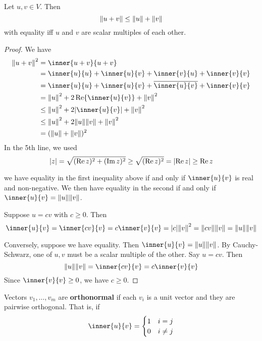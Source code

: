 \documentclass{article}
\begin{document}
\begin{cthm}
  Let $u, v \in V$. Then \[
    \norm{u+v} \leq \norm{u} + \norm{v}
  \] with equality iff $u$ and $v$ are scalar multiples of each other.
\end{cthm}
\begin{proof}
  We have
  \begin{align*}
    \norm{u + v}^2 & = \inner{u+v}{u+v}                                                     \\
                   & = \inner{u}{u} + \inner{u}{v} + \inner{v}{u} + \inner{v}{v}            \\
                   & = \inner{u}{u} + \inner{u}{v} + \overline{\inner{u}{v}} + \inner{v}{v} \\
                   & = \norm{u}^2 + 2\Re\inner{u}{v} + \norm{v}^2                           \\
                   & \leq \norm{u}^2 + 2\abs{\inner{u}{v}} + \norm{v}^2                     \\
                   & \leq \norm{u}^2 + 2\norm{u}\norm{v} + \norm{v}^2                       \\
                   & = (\norm{u}+ \norm{v})^2
  \end{align*}
  In the 5th line, we used \[
    \abs{z} = \sqrt{(\Re z)^2 + (\Im z)^2} \geq \sqrt{(\Re z)^2} = \abs{\Re z} \geq \Re z
  \]

  we have equality in the first inequality above if and only if $\inner{u}{v}$ is real and non-negative. We then have equality in the second if and only if $\inner{u}{v} = \norm{u}\norm{v}$.

  Suppose $u = cv$ with $c \geq 0$. Then \[
    \inner{u}{v} = \inner{cv}{v} = c\inner{v}{v} = \abs{c}\norm{v}^2 = \norm{cv}\norm{v} = \norm{u}\norm{v}
  \]

  Conversely, suppose we have equality. Then $\inner{u}{v} = \norm{u}\norm{v}$. By Cauchy-Schwarz, one of $u, v$ must be a scalar multiple of the other. Say $u = cv$. Then \[
    \norm{u}\norm{v} = \inner{cv}{v} = c\inner{v}{v}
  \]
  Since $\inner{v}{v} \geq 0$, we have $c \geq 0$.
\end{proof}
\begin{definition}
  Vectors $v_1, \ldots, v_m$ are \textbf{orthonormal} if each $v_i$ is a unit vector and they are pairwise orthogonal. That is, if \[
    \inner{u}{v} =
    \begin{cases}
      1 & i = j    \\
      0 & i \neq j \\
    \end{cases}
  \]
\end{definition}
\end{document}
